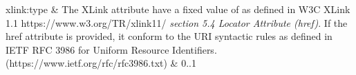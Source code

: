 \begin{longtabu}
\gls{xlink:type}
&
The XLink  attribute \MUST have a fixed value of  as defined in W3C XLink 1.1 https://www.w3.org/TR/xlink11/ \textit{section 5.4 Locator Attribute (\gls{href})}.
\newline If the \gls{href} attribute is provided, it \MUST conform to the URI syntactic rules as defined in IETF RFC 3986 for Uniform Resource Identifiers. (https://www.ietf.org/rfc/rfc3986.txt)
&
0..1 \\\hline
\hline\end{longtabu}